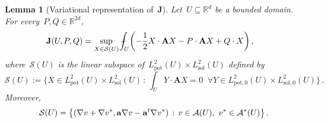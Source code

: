 \documentclass[11pt]{article} %
\numberwithin{equation}{section}
\newtheorem{lemma}[theorem]{Lemma}
\theoremstyle{definition}
\let\originalleft\left
\let\originalright\right
\renewcommand{\left}{\mathopen{}\mathclose\bgroup\originalleft}
\renewcommand{\right}{\aftergroup\egroup\originalright}
\newcommand*{\R}{\ensuremath{\mathbb{R}}}
\newcommand*{\Rd}{\ensuremath{\mathbb{R}^d}}
\renewcommand{\a}{\mathbf{a}}
\renewcommand{\S}{\mathcal{S}}
\def\Xint#1{\mathchoice
{\XXint\displaystyle\textstyle{#1}}%
{\XXint\textstyle\scriptstyle{#1}}%
{\XXint\scriptstyle\scriptscriptstyle{#1}}%
{\XXint\scriptscriptstyle\scriptscriptstyle{#1}}%
\!\int}
\def\XXint#1#2#3{{\setbox0=\hbox{$#1{#2#3}{\int}$}
\vcenter{\hbox{$#2#3$}}\kern-.5\wd0}}
\def\fint{\Xint-}
\newcommand{\A}{\mathcal{A}}
\newcommand{\Lsol}{L^2_{\mathrm{sol}}}
\newcommand{\Lsolo}{L^2_{\mathrm{sol,0}}}
\newcommand{\Lpot}{L^2_{\mathrm{pot}}}
\newcommand{\Lpoto}{L^2_{\mathrm{pot,0}}}
\newcommand{\bfA}{\mathbf{A}}
\newcommand{\bfJ}{\mathbf{J}}
\begin{document}
\begin{lemma}[Variational representation of~$\bfJ$]
\label{l.bfJ.represent}
Let~$U\subseteq\Rd$ be a bounded domain. For every~$P ,Q \in \R^{2d}$, 
\begin{align}
\label{e.bfJ.var}
\bfJ(U, P,Q )
&
=
\sup_{X  \in \S(U)}
\fint_U
\biggl(
-\frac12  X  \cdot \bfA X
- 
P
\cdot
\bfA
X
+
Q
\cdot
X
\biggr)
\,,
\end{align}
where~$\S(U)$ is the linear subspace of~$\Lpot(U) \times \Lsol(U)$
defined by
\begin{equation}
\label{e.bfS}
\S(U) :=
\biggl\{
X \in \Lpot(U) \times \Lsol(U) 
\,:\, 
\int_U 
Y 
\cdot 
\bfA X
=0
\; \;  \forall Y \in 
\Lpoto(U) \times \Lsolo(U)
\biggr\}
\,.
\end{equation}
Moreover, 
\begin{equation}
\label{e.findS}
\S(U)
=
\left\{ (\nabla v+\nabla v^*, \a\nabla v - \a^t\nabla v^*) \,:\, v\in \A(U), \ v^*\in \A^*(U)
\right\}
\,.
\end{equation}
\end{lemma}
\end{document}
